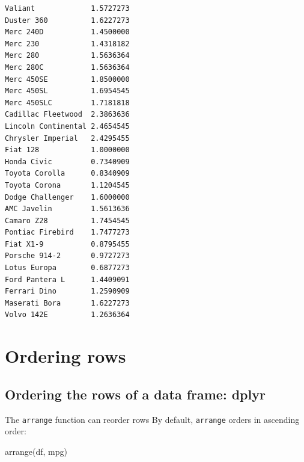 \documentclass[
]{article}
\newenvironment{Shaded}{\begin{snugshade}}{\end{snugshade}}
\newcommand{\FunctionTok}[1]{\textcolor[rgb]{0.00,0.00,0.00}{#1}}
\newcommand{\NormalTok}[1]{#1}
\begin{document}
\begin{verbatim}
Valiant             1.5727273
Duster 360          1.6227273
Merc 240D           1.4500000
Merc 230            1.4318182
Merc 280            1.5636364
Merc 280C           1.5636364
Merc 450SE          1.8500000
Merc 450SL          1.6954545
Merc 450SLC         1.7181818
Cadillac Fleetwood  2.3863636
Lincoln Continental 2.4654545
Chrysler Imperial   2.4295455
Fiat 128            1.0000000
Honda Civic         0.7340909
Toyota Corolla      0.8340909
Toyota Corona       1.1204545
Dodge Challenger    1.6000000
AMC Javelin         1.5613636
Camaro Z28          1.7454545
Pontiac Firebird    1.7477273
Fiat X1-9           0.8795455
Porsche 914-2       0.9727273
Lotus Europa        0.6877273
Ford Pantera L      1.4409091
Ferrari Dino        1.2590909
Maserati Bora       1.6227273
Volvo 142E          1.2636364
\end{verbatim}

\hypertarget{ordering-rows}{%
\section{Ordering rows}\label{ordering-rows}}

\hypertarget{ordering-the-rows-of-a-data-frame-dplyr}{%
\subsection{Ordering the rows of a data frame:
dplyr}\label{ordering-the-rows-of-a-data-frame-dplyr}}

The \texttt{arrange} function can reorder rows By default,
\texttt{arrange} orders in ascending order:

\begin{Shaded}
\begin{Highlighting}[]
\FunctionTok{arrange}\NormalTok{(df, mpg)}
\end{Highlighting}
\end{Shaded}
\end{document}
